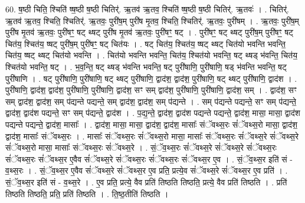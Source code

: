 \documentclass[17pt]{extarticle}
\begin{document}
60. ष॒ष्ठी चिति॒ श्चिति॑ ष्ष॒ष्ठी ष॒ष्ठी चितिर्॑. ऋ॒तव॑ ऋ॒तव॒ श्चिति॑ ष्ष॒ष्ठी ष॒ष्ठी चितिर्॑. ऋ॒तवः॑ । . चितिर्॑. ऋ॒तव॑ ऋ॒तव॒ श्चिति॒ श्चितिर्॑. ऋ॒तवः॒ पुरी॑ष॒म् पुरी॑ष मृ॒तव॒ श्चिति॒ श्चितिर्॑. ऋ॒तवः॒ पुरी॑षम् । . ऋ॒तवः॒ पुरी॑ष॒म् पुरी॑ष मृ॒तव॑ ऋ॒तवः॒ पुरी॑षꣳ॒॒ षट् थ्षट् पुरी॑ष मृ॒तव॑ ऋ॒तवः॒ पुरी॑षꣳ॒॒ षट् । . पुरी॑षꣳ॒॒ षट् थ्षट् पुरी॑ष॒म् पुरी॑षꣳ॒॒ षट् चित॑य॒ श्चित॑य॒ ष्षट् पुरी॑ष॒म् पुरी॑षꣳ॒॒ षट् चित॑यः । . षट् चित॑य॒ श्चित॑य॒ ष्षट् थ्षट् चित॑यो भवन्ति भवन्ति॒ चित॑य॒ ष्षट् थ्षट् चित॑यो भवन्ति । . चित॑यो भवन्ति भवन्ति॒ चित॑य॒ श्चित॑यो भवन्ति॒ षट् थ्षड् भ॑वन्ति॒ चित॑य॒ श्चित॑यो भवन्ति॒ षट् । . भ॒व॒न्ति॒ षट् थ्षड् भ॑वन्ति भवन्ति॒ षट् पुरी॑षाणि॒ पुरी॑षाणि॒ षड् भ॑वन्ति भवन्ति॒ षट् पुरी॑षाणि । . षट् पुरी॑षाणि॒ पुरी॑षाणि॒ षट् थ्षट् पुरी॑षाणि॒ द्वाद॑श॒ द्वाद॑श॒ पुरी॑षाणि॒ षट् थ्षट् पुरी॑षाणि॒ द्वाद॑श । . पुरी॑षाणि॒ द्वाद॑श॒ द्वाद॑श॒ पुरी॑षाणि॒ पुरी॑षाणि॒ द्वाद॑श॒ सꣳ सम् द्वाद॑श॒ पुरी॑षाणि॒ पुरी॑षाणि॒ द्वाद॑श॒ सम् । . द्वाद॑श॒ सꣳ सम् द्वाद॑श॒ द्वाद॑श॒ सम् प॑द्यन्ते पद्यन्ते॒ सम् द्वाद॑श॒ द्वाद॑श॒ सम् प॑द्यन्ते । . सम् प॑द्यन्ते पद्यन्ते॒ सꣳ सम् प॑द्यन्ते॒ द्वाद॑श॒ द्वाद॑श पद्यन्ते॒ सꣳ सम् प॑द्यन्ते॒ द्वाद॑श । . प॒द्य॒न्ते॒ द्वाद॑श॒ द्वाद॑श पद्यन्ते पद्यन्ते॒ द्वाद॑श॒ मासा॒ मासा॒ द्वाद॑श पद्यन्ते पद्यन्ते॒ द्वाद॑श॒ मासाः᳚ । . द्वाद॑श॒ मासा॒ मासा॒ द्वाद॑श॒ द्वाद॑श॒ मासाः᳚ संॅवथ्स॒रः सं॑ॅवथ्स॒रो मासा॒ द्वाद॑श॒ द्वाद॑श॒ मासाः᳚ संॅवथ्स॒रः । . मासाः᳚ संॅवथ्स॒रः सं॑ॅवथ्स॒रो मासा॒ मासाः᳚ संॅवथ्स॒रः सं॑ॅवथ्स॒रे सं॑ॅवथ्स॒रे सं॑ॅवथ्स॒रो मासा॒ मासाः᳚ संॅवथ्स॒रः सं॑ॅवथ्स॒रे । . सं॒ॅव॒थ्स॒रः सं॑ॅवथ्स॒रे सं॑ॅवथ्स॒रे सं॑ॅवथ्स॒रः सं॑ॅवथ्स॒रः सं॑ॅवथ्स॒र ए॒वैव सं॑ॅवथ्स॒रे सं॑ॅवथ्स॒रः सं॑ॅवथ्स॒रः सं॑ॅवथ्स॒र ए॒व । . सं॒ॅव॒थ्स॒र इति॑ सं - व॒थ्स॒रः । . सं॒ॅव॒थ्स॒र ए॒वैव सं॑ॅवथ्स॒रे सं॑ॅवथ्स॒र ए॒व प्रति॒ प्रत्ये॒व सं॑ॅवथ्स॒रे सं॑ॅवथ्स॒र ए॒व प्रति॑ । . सं॒ॅव॒थ्स॒र इति॑ सं - व॒थ्स॒रे । . ए॒व प्रति॒ प्रत्ये॒ वैव प्रति॑ तिष्ठति तिष्ठति॒ प्रत्ये॒ वैव प्रति॑ तिष्ठति । . प्रति॑ तिष्ठति तिष्ठति॒ प्रति॒ प्रति॑ तिष्ठति । . ति॒ष्ठ॒तीति॑ तिष्ठति । \newline
\pagebreak
{}
\end{document}
